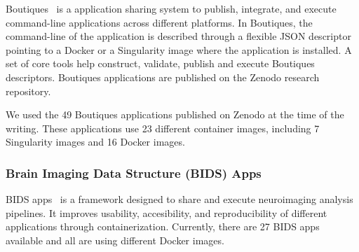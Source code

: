 \documentclass[a4paper,num-refs]{oup-contemporary}
\begin{document}
Boutiques~\cite{glatard2018boutiques} is a application sharing system to
publish, integrate, and execute command-line applications across different
platforms. In Boutiques, the command-line of the application is described
through a flexible JSON descriptor pointing to a Docker or a Singularity
image where the application is installed. A set of core tools help
construct, validate, publish and execute Boutiques descriptors. Boutiques
applications are published on the Zenodo research repository.

We used the 49 Boutiques applications published on Zenodo at the time of
the writing. These applications use 23 different container images,
including 7 Singularity images and 16 Docker images.

\subsubsection{Brain Imaging Data Structure (BIDS) Apps}

BIDS apps~\cite{gorgolewski2017bids} is a framework designed to share and execute neuroimaging
analysis pipelines. It improves usability, accesibility, and reproducibility
of different applications through containerization.
Currently, there are 27 BIDS apps available and all are using different Docker images.
\end{document}
